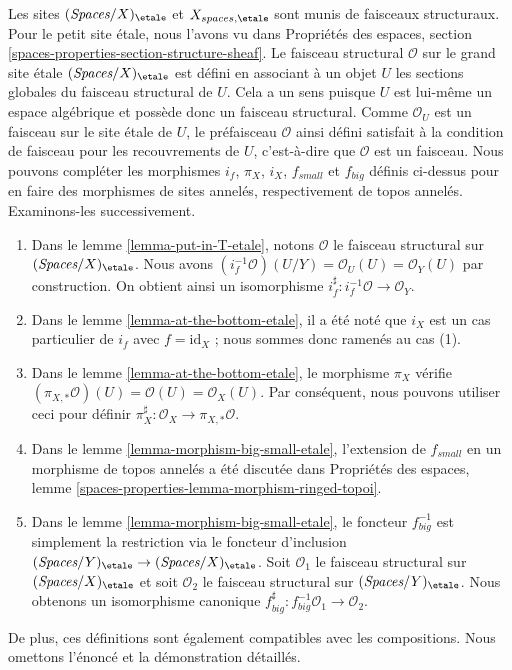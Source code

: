 \begin{remark}
\label{remark-change-topologies-ringed}
Les sites $(\textit{Spaces}/X)_\etale$ et $X_{spaces, \etale}$
sont munis de faisceaux structuraux. Pour le petit site \'etale, nous
l'avons vu dans Propriétés des espaces, section
\ref{spaces-properties-section-structure-sheaf}.
Le faisceau structural $\mathcal{O}$ sur le grand site \'etale
$(\textit{Spaces}/X)_\etale$ est défini en associant à un objet
$U$ les sections globales du faisceau structural de $U$.
Cela a un sens puisque $U$ est lui-même un espace algébrique
et possède donc un faisceau structural. Comme $\mathcal{O}_U$
est un faisceau sur le site \'etale de $U$, le préfaisceau $\mathcal{O}$
ainsi défini satisfait à la condition de faisceau pour les recouvrements de $U$, c'est-à-dire que
$\mathcal{O}$ est un faisceau.
Nous pouvons compléter les morphismes $i_f$, $\pi_X$, $i_X$, $f_{small}$ et
$f_{big}$ définis ci-dessus pour en faire des morphismes de sites annelés, respectivement de topos annelés.
Examinons-les successivement.
\begin{enumerate}
\item Dans le lemme \ref{lemma-put-in-T-etale}, notons $\mathcal{O}$
le faisceau structural sur $(\textit{Spaces}/X)_\etale$.
Nous avons $(i_f^{-1}\mathcal{O})(U/Y) = \mathcal{O}_U(U) = \mathcal{O}_Y(U)$
par construction.
On obtient ainsi un isomorphisme $i_f^\sharp : i_f^{-1}\mathcal{O} \to \mathcal{O}_Y$.
\item Dans le lemme \ref{lemma-at-the-bottom-etale}, il a été noté
que $i_X$ est un cas particulier de $i_f$ avec $f = \text{id}_X$ ;
nous sommes donc ramenés au cas (1).
\item Dans le lemme \ref{lemma-at-the-bottom-etale}, le morphisme
$\pi_X$ vérifie $(\pi_{X, *}\mathcal{O})(U) = \mathcal{O}(U) =
\mathcal{O}_X(U)$. Par conséquent, nous pouvons utiliser ceci pour définir
$\pi_X^\sharp : \mathcal{O}_X \to \pi_{X, *}\mathcal{O}$.
\item Dans le lemme \ref{lemma-morphism-big-small-etale},
l'extension de $f_{small}$ en un morphisme de topos annelés
a été discutée dans Propriétés des espaces, lemme
\ref{spaces-properties-lemma-morphism-ringed-topoi}.
\item Dans le lemme \ref{lemma-morphism-big-small-etale},
le foncteur $f_{big}^{-1}$ est simplement la restriction
via le foncteur d'inclusion
$(\textit{Spaces}/Y)_\etale \to (\textit{Spaces}/X)_\etale$.
Soit $\mathcal{O}_1$ le faisceau structural sur $(\textit{Spaces}/X)_\etale$
et soit $\mathcal{O}_2$ le faisceau structural sur $(\textit{Spaces}/Y)_\etale$.
Nous obtenons un isomorphisme canonique
$f_{big}^\sharp : f_{big}^{-1}\mathcal{O}_1 \to \mathcal{O}_2$.
\end{enumerate}
De plus, ces définitions sont également compatibles avec les compositions.
Nous omettons l'énoncé et la démonstration détaillés.
\end{remark}









